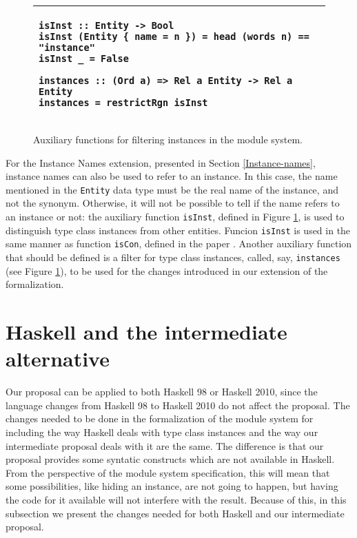 \documentclass[msc]{ppgccufmg}
\begin{document}
\begin{figure}
\caption{Auxiliary functions for filtering instances in the module
  system.\label{new}}
\begin{tabular}{|p{\textwidth}|}
\hline
\begin{verbatim}
isInst :: Entity -> Bool
isInst (Entity { name = n }) = head (words n) == "instance"
isInst _ = False

instances :: (Ord a) => Rel a Entity -> Rel a Entity
instances = restrictRgn isInst
\end{verbatim}
\\
\hline
\end{tabular}
\end{figure}

For the Instance Names extension, presented in Section
\ref{Instance-names}, instance names can also be used to refer to an
instance. In this case, the name mentioned in the \texttt{Entity} data
type must be the real name of the instance, and not the synonym.
Otherwise, it will not be possible to tell if the name refers to an
instance or not: the auxiliary function \texttt{isInst}, defined in
Figure \ref{new}, is used to distinguish type class instances from
other entities. Funcion \texttt{isInst} is used in the same manner as
function \texttt{isCon}, defined in the paper \citep[section
  3.1]{formal}. Another auxiliary function that should be defined is a
filter for type class instances, called, say, \texttt{instances} (see
Figure \ref{new}), to be used for the changes introduced in our
extension of the formalization. 

\section{Haskell and the intermediate alternative}
Our proposal can be applied to both Haskell 98 or Haskell 2010, since
the language changes from Haskell 98 to Haskell 2010 do not affect the
proposal.  The changes needed to be done in the formalization of the module
system for including the way Haskell deals with type class
instances and the way our intermediate proposal deals with it are the
same.  The difference is that our proposal provides some syntatic
constructs which are not available in Haskell.  From the
perspective of the module system specification, this will mean that
some possibilities, like hiding an instance, are not going to happen,
but having the code for it available will not interfere with the
result.  Because of this, in this subsection we present the changes
needed for both Haskell and our intermediate proposal.
\end{document}

